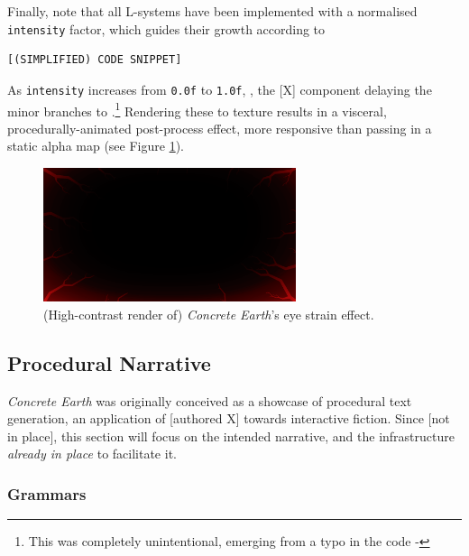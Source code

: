 \documentclass[a4paper, 11pt]{article}
\begin{document}
\begin{flushleft}
\vspace{5pt} Finally, note that all L-systems have been implemented with a normalised \texttt{intensity} factor, which guides their growth according to
\begin{center}
\begin{BVerbatim}
[(SIMPLIFIED) CODE SNIPPET]
\end{BVerbatim}
\end{center}
As \texttt{intensity} increases from \texttt{0.0f} to \texttt{1.0f}, , the [X] component delaying the minor branches to .\footnote{This was completely unintentional, emerging from a typo in the code - } Rendering these to texture results in a visceral, procedurally-animated post-process effect, more responsive than passing in a static alpha map (see Figure \ref{Eye Strain Effect}). 

\vspace{5pt}\noindent
\begin{figure}[h]
\centering
\includegraphics[width=0.66\textwidth]{Eye Strain Effect}
\caption{(High-contrast render of) \textit{Concrete Earth}'s eye strain effect.}
\label{Eye Strain Effect}
\end{figure}

\subsection{Procedural Narrative} %

\textit{Concrete Earth} was originally conceived as a showcase of procedural text generation, an application of [authored X] towards interactive fiction. Since [not in place], this section will focus on the intended narrative, and the infrastructure \textit{already in place} to facilitate it. 

\subsubsection{Grammars}


\end{flushleft}
\end{document}
